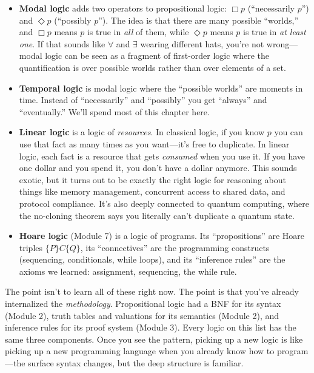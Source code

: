 \documentclass[11pt]{article}
\begin{document}
\begin{itemize}
  \item \textbf{Modal logic} adds two operators to propositional logic: $\Box p$ (``necessarily $p$'') and $\Diamond p$ (``possibly $p$''). The idea is that there are many possible ``worlds,'' and $\Box p$ means $p$ is true in \emph{all} of them, while $\Diamond p$ means $p$ is true in \emph{at least one}. If that sounds like $\forall$ and $\exists$ wearing different hats, you're not wrong---modal logic can be seen as a fragment of first-order logic where the quantification is over possible worlds rather than over elements of a set.

  \item \textbf{Temporal logic} is modal logic where the ``possible worlds'' are moments in time. Instead of ``necessarily'' and ``possibly'' you get ``always'' and ``eventually.'' We'll spend most of this chapter here.

  \item \textbf{Linear logic} is a logic of \emph{resources}. In classical logic, if you know $p$ you can use that fact as many times as you want---it's free to duplicate. In linear logic, each fact is a resource that gets \emph{consumed} when you use it. If you have one dollar and you spend it, you don't have a dollar anymore. This sounds exotic, but it turns out to be exactly the right logic for reasoning about things like memory management, concurrent access to shared data, and protocol compliance. It's also deeply connected to quantum computing, where the no-cloning theorem says you literally can't duplicate a quantum state.

  \item \textbf{Hoare logic} (Module 7) is a logic of programs. Its ``propositions'' are Hoare triples $\{P\}C\{Q\}$, its ``connectives'' are the programming constructs (sequencing, conditionals, while loops), and its ``inference rules'' are the axioms we learned: assignment, sequencing, the while rule.
\end{itemize}

The point isn't to learn all of these right now. The point is that you've already internalized the \emph{methodology}. Propositional logic had a BNF for its syntax (Module 2), truth tables and valuations for its semantics (Module 2), and inference rules for its proof system (Module 3). Every logic on this list has the same three components. Once you see the pattern, picking up a new logic is like picking up a new programming language when you already know how to program---the surface syntax changes, but the deep structure is familiar.
\end{document}
